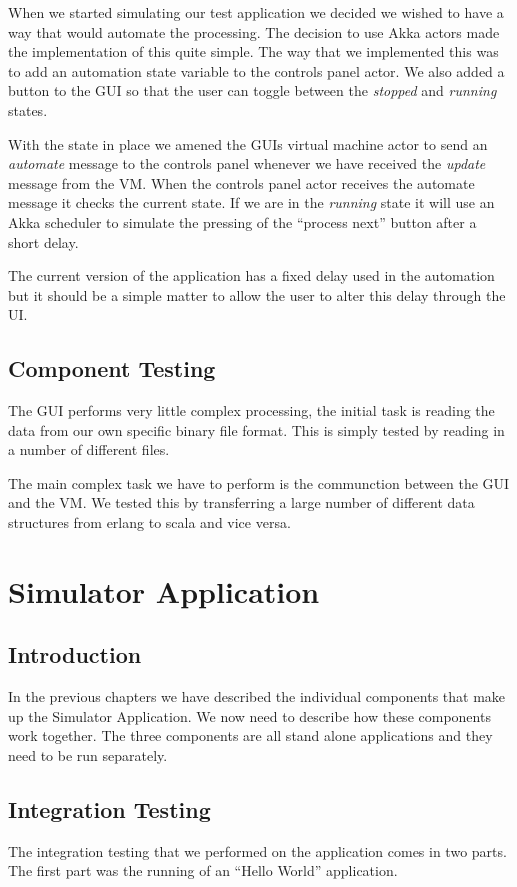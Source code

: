 \documentclass[a4paper,11pt]{report}
\begin{document}
When we started simulating our test application we decided we wished to have a way that would automate the processing. The decision to use Akka actors made the implementation of this quite simple. The way that we implemented this was to add an automation state variable to the controls panel actor. We also added a button to the GUI so that the user can toggle between the \textit{stopped} and \textit{running} states.

With the state in place we amened the GUIs virtual machine actor to send an \textit{automate} message to the controls panel whenever we have received the \textit{update} message from the VM. When the controls panel actor receives the automate message it checks the current state. If we are in the \textit{running} state it will use an Akka scheduler to simulate the pressing of the ``process next'' button after a short delay.

The current version of the application has a fixed delay used in the automation but it should be a simple matter to allow the user to alter this delay through the UI.

\section{Component Testing}
The GUI performs very little complex processing, the initial task is reading the data from our own specific binary file format. This is simply tested by reading in a number of different files.

The main complex task we have to perform is the communction between the GUI and the VM. We tested this by transferring a large number of different data structures from erlang to scala and vice versa.

\chapter{Simulator Application}
\section{Introduction}
In the previous chapters we have described the individual components that make up the Simulator Application. We now need to describe how these components work together. The three components are all stand alone applications and they need to be run separately.
\section{Integration Testing}
The integration testing that we performed on the application comes in two parts. The first part was the running of an ``Hello World'' application.
\end{document}
